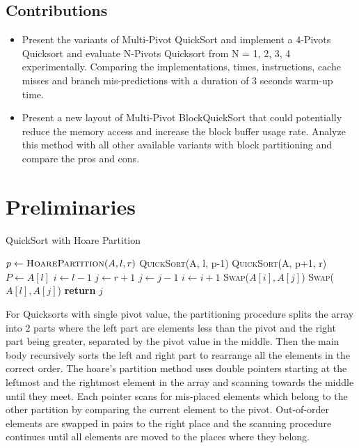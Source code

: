 \documentclass{article}
\begin{document}
\subsection{Contributions}
\begin{itemize}
    \item Present the variants of Multi-Pivot QuickSort and implement a 4-Pivots Quicksort and evaluate N-Pivots Quicksort from N = 1, 2, 3, 4 experimentally. 
        Comparing the implementations, times, instructions, cache misses and branch mis-predictions with a duration of 3 seconds warm-up time.
    \item Present a new layout of Multi-Pivot BlockQuickSort that could potentially reduce the memory access and increase the block buffer usage rate. 
        Analyze this method with all other available variants with block partitioning and compare the pros and cons.
\end{itemize}

\section{Preliminaries}
\begin{algorithm}[H]
    \caption{QuickSort with Hoare Partition}\label{HoarePartition}
    \begin{algorithmic}[1]
        \State $p \gets \textsc{HoarePartition}(A, l, r)$
        \State \textsc{QuickSort}(A, l, p-1)
        \State \textsc{QuickSort}(A, p+1, r)
        \EndIf
        \EndProcedure
        \State $P \gets A[l]$ 
        \State $i \gets l - 1$
        \State $j \gets r + 1$
        \Repeat
        \State $j \gets j - 1$
        \Repeat
        \State $i \gets i + 1$
        \State \textsc{Swap}($A[i], A[j]$)
        \EndWhile
        \State \textsc{Swap}($A[l], A[j]$) 
        \State \textbf{return} $j$
        \EndProcedure
    \end{algorithmic}
\end{algorithm}

For Quicksorts with single pivot value, the partitioning procedure splits the array into 2 parts where the left part are elements less than the pivot and the right part being greater, 
separated by the pivot value in the middle. Then the main body recursively sorts the left and right part to rearrange all the elements in the correct order. The hoare's partition method
uses double pointers starting at the leftmost and the rightmost element in the array and scanning towards the middle until they meet. Each pointer scans for mis-placed elements 
which belong to the other partition by comparing the current element to the pivot. 
Out-of-order elements are swapped in pairs to the right place and the scanning procedure continues until all elements 
are moved to the places where they belong.
\end{document}
